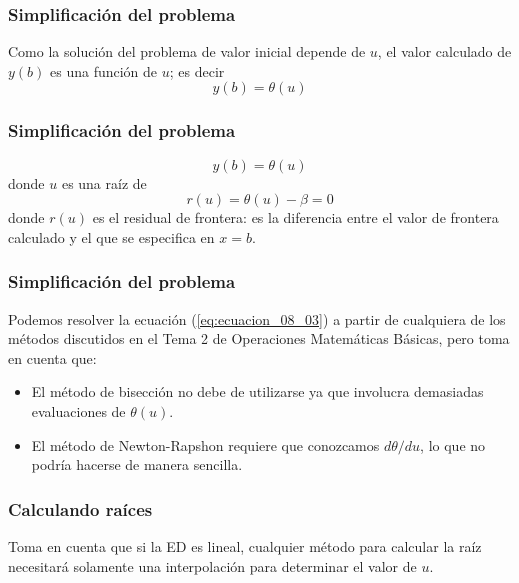 \begin{frame}
\frametitle{Simplificación del problema}
Como la solución del problema de valor inicial depende de $u$, el valor calculado de $y(b)$ es una función de $u$; es decir
\[ y(b) = \theta(u) \]
\end{frame}
\begin{frame}
\frametitle{Simplificación del problema}
\[ y(b) = \theta(u) \]
donde $u$ es una raíz de
\begin{equation}
r(u) = \theta(u) - \beta = 0
\label{eq:ecuacion_08_03}
\end{equation}
donde $r(u)$ es el residual de frontera: es la diferencia entre el valor de frontera calculado y el que se especifica en $x=b$.
\end{frame}
\begin{frame}
\frametitle{Simplificación del problema}
Podemos resolver la ecuación (\ref{eq:ecuacion_08_03}) a partir de cualquiera de los métodos discutidos en el Tema 2 de Operaciones Matemáticas Básicas, pero toma en cuenta que:
\pause
\begin{itemize}[<+->]
\item El método de bisección no debe de utilizarse ya que involucra demasiadas evaluaciones de $\theta(u)$.
\item El método de Newton-Rapshon requiere que conozcamos $d \theta / d u$, lo que no podría hacerse de manera sencilla.
\end{itemize}
\end{frame}
\begin{frame}
\frametitle{Calculando raíces}
Toma en cuenta que si la ED es lineal, cualquier método para calcular la raíz necesitará solamente una interpolación para determinar el valor de $u$.
\end{frame}
